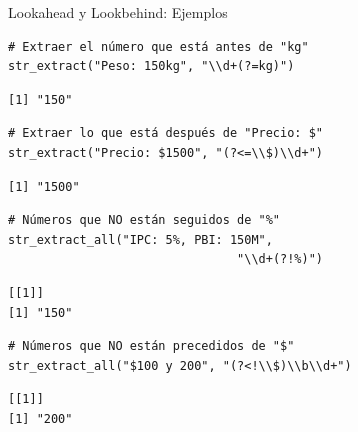 \documentclass[8pt]{beamer}
\begin{document}
\begin{frame}[fragile]{Lookahead y Lookbehind: Ejemplos}
\begin{lstlisting}[style=RScript]
# Extraer el número que está antes de "kg"
str_extract("Peso: 150kg", "\\d+(?=kg)")
\end{lstlisting}
\begin{lstlisting}[style=RConsole]
[1] "150"
\end{lstlisting}

\begin{lstlisting}[style=RScript]
# Extraer lo que está después de "Precio: $"
str_extract("Precio: $1500", "(?<=\\$)\\d+")
\end{lstlisting}
\begin{lstlisting}[style=RConsole]
[1] "1500"
\end{lstlisting}
\end{frame}







\begin{frame}[fragile]
\begin{lstlisting}[style=RScript]
# Números que NO están seguidos de "%"
str_extract_all("IPC: 5%, PBI: 150M",
								"\\d+(?!%)")
\end{lstlisting}
\begin{lstlisting}[style=RConsole]
[[1]]
[1] "150"
\end{lstlisting}

\begin{lstlisting}[style=RScript]
# Números que NO están precedidos de "$"
str_extract_all("$100 y 200", "(?<!\\$)\\b\\d+")
\end{lstlisting}
\begin{lstlisting}[style=RConsole]
[[1]]
[1] "200"
\end{lstlisting}
\end{frame}
\end{document}
